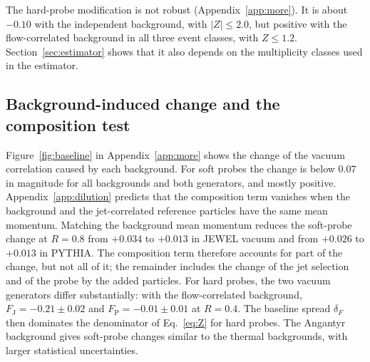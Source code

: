 \documentclass[aps,prc,twocolumn,superscriptaddress,nofootinbib,longbibliography,floatfix,10pt]{revtex4-2}
\begin{document}
The hard-probe modification is not robust (Appendix~\ref{app:more}). It is about $-0.10$ with the independent background, with $|Z|\le2.0$, but positive with the flow-correlated background in all three event classes, with $Z\le1.2$. Section~\ref{sec:estimator} shows that it also depends on the multiplicity classes used in the estimator.

\subsection{Background-induced change and the composition test}
Figure~\ref{fig:baseline} in Appendix~\ref{app:more} shows the change of the vacuum correlation caused by each background. For soft probes the change is below $0.07$ in magnitude for all backgrounds and both generators, and mostly positive. Appendix~\ref{app:dilution} predicts that the composition term vanishes when the background and the jet-correlated reference particles have the same mean momentum. Matching the background mean momentum reduces the soft-probe change at $R=0.8$ from $+0.034$ to $+0.013$ in JEWEL vacuum and from $+0.026$ to $+0.013$ in PYTHIA. The composition term therefore accounts for part of the change, but not all of it; the remainder includes the change of the jet selection and of the probe by the added particles. For hard probes, the two vacuum generators differ substantially: with the flow-correlated background, $F_{\mathrm J}=-0.21\pm0.02$ and $F_{\mathrm P}=-0.01\pm0.01$ at $R=0.4$. The baseline spread $\delta_F$ then dominates the denominator of Eq.~\eqref{eq:Z} for hard probes. The Angantyr background gives soft-probe changes similar to the thermal backgrounds, with larger statistical uncertainties.
\end{document}

